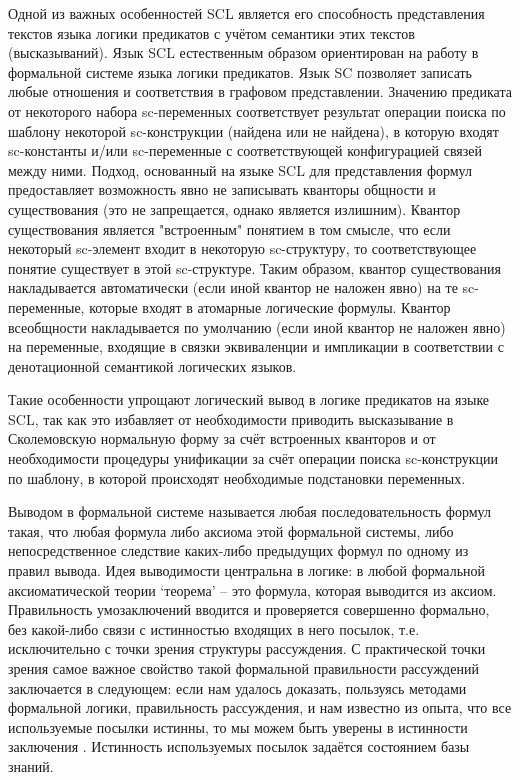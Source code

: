 Одной из важных особенностей SCL является его способность представления текстов языка логики предикатов с учётом семантики этих текстов (высказываний). Язык SCL естественным образом ориентирован на работу в формальной системе языка логики предикатов. Язык SC позволяет записать любые отношения и соответствия в графовом представлении. Значению предиката от некоторого набора sc-переменных соответствует результат операции поиска по шаблону некоторой sc-конструкции (найдена или не найдена), в которую входят sc-константы и/или sc-переменные с соответствующей конфигурацией связей между ними. Подход, основанный на языке SCL для представления формул предоставляет возможность явно не записывать кванторы общности и существования (это не запрещается, однако является излишним). Квантор существования является "встроенным"{} понятием в том смысле, что если некоторый sc-элемент входит в некоторую sc-структуру, то соответствующее понятие существует в этой sc-структуре. Таким образом, квантор существования накладывается автоматически (если иной квантор не наложен явно) на те sc-переменные, которые входят в атомарные логические формулы. Квантор всеобщности накладывается по умолчанию (если иной квантор не наложен явно) на переменные, входящие в связки эквиваленции и импликации в соответствии с денотационной семантикой логических языков.

Такие особенности упрощают логический вывод в логике предикатов на языке SCL, так как это избавляет от необходимости приводить высказывание в Сколемовскую нормальную форму за счёт встроенных кванторов и от необходимости процедуры унификации за счёт операции поиска sc-конструкции по шаблону, в которой происходят необходимые подстановки переменных.

Выводом в формальной системе называется любая последовательность формул такая, что любая формула либо аксиома этой формальной системы, либо непосредственное следствие каких-либо предыдущих формул по одному из правил вывода. Идея выводимости центральна в логике: в любой формальной аксиоматической теории `теорема' – это формула, которая выводится из аксиом. Правильность умозаключений вводится и проверяется совершенно формально, без какой-либо связи с истинностью входящих в него посылок, т.е. исключительно с точки зрения структуры рассуждения. С практической точки зрения самое важное свойство такой формальной правильности рассуждений заключается в следующем: если нам удалось доказать, пользуясь методами формальной логики, правильность рассуждения, и нам известно из опыта, что все используемые посылки истинны, то мы можем быть уверены в истинности заключения \cite{vagin}. Истинность используемых посылок задаётся состоянием базы знаний.

